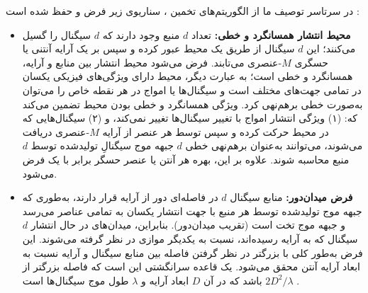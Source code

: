 در سرتاسر توصیف ما از الگوریتم‌های تخمین ، سناریوی زیر فرض و حفظ شده است \cite{2}:

\begin{itemize}
	\item \textbf{محیط انتشار همسانگرد و خطی:} تعداد $d$ منبع وجود دارند که $d$ سیگنال را گسیل می‌کنند؛ این $d$ سیگنال از طریق یک محیط عبور کرده و سپس بر یک آرایه آنتنی یا حسگری $M$-عنصری می‌تابند. فرض می‌شود محیط انتشار بین منابع و آرایه، همسانگرد و خطی است؛ به عبارت دیگر، محیط دارای ویژگی‌های فیزیکی یکسان در تمامی جهت‌های مختلف است و سیگنال‌ها یا امواج در هر نقطه خاص را می‌توان به‌صورت خطی برهم‌نهی کرد. ویژگی همسانگرد و خطی بودن محیط تضمین می‌کند که: (۱) ویژگی انتشار امواج با تغییر  سیگنال‌ها تغییر نمی‌کند، و (۲) سیگنال‌هایی که در محیط حرکت کرده و سپس توسط هر عنصر از آرایه $M$-عنصری دریافت می‌شوند، می‌توانند به‌عنوان برهم‌نهی خطی $d$ جبهه موج سیگنالِ تولیدشده توسط $d$ منبع محاسبه شوند. علاوه بر این، بهره هر آنتن یا عنصر حسگر برابر با یک فرض می‌شود.
	
	\item \textbf{فرض میدان‌دور:} منابع سیگنال $d$ در فاصله‌ای دور از آرایه قرار دارند، به‌طوری که جبهه موج تولیدشده توسط هر منبع با جهت انتشار یکسان به تمامی عناصر می‌رسد و جبهه موج تخت است (تقریب میدان‌دور). بنابراین، میدان‌های در حال انتشار $d$ سیگنال که به آرایه رسیده‌اند، نسبت به یکدیگر موازی در نظر گرفته می‌شوند. این فرض به‌طور کلی با بزرگتر در نظر گرفتن فاصله بین منابع سیگنال و آرایه نسبت به ابعاد آرایه آنتن محقق می‌شود. یک قاعده سرانگشتی این است که فاصله بزرگتر از $2D^2/\lambda$ باشد که در آن $D$ ابعاد آرایه و $\lambda$ طول موج سیگنال‌ها است \cite{3}.
	

\end{itemize}
